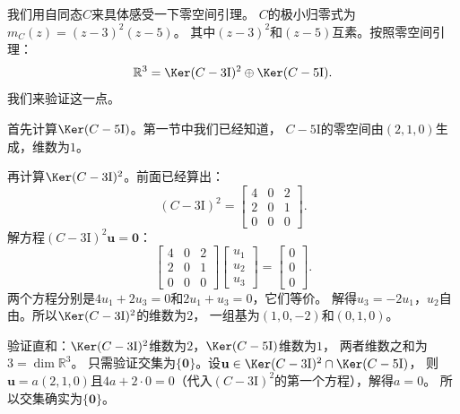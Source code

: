 \documentclass[12pt,UTF8]{ctexbook}
\begin{document}
我们用自同态$C$来具体感受一下零空间引理。
$C$的极小归零式为$m_C(z) = (z-3)^2(z-5)$。
其中$(z-3)^2$和$(z-5)$互素。按照零空间引理：
$$
\mathbb{R}^3 = \Ker (C-3\mathrm{I})^2 \oplus \Ker (C-5\mathrm{I}).
$$
我们来验证这一点。

首先计算$\Ker(C-5\mathrm{I})$。第一节中我们已经知道，
$C-5\mathrm{I}$的零空间由$(2,1,0)$生成，维数为$1$。

再计算$\Ker(C-3\mathrm{I})^2$。前面已经算出：
$$
(C-3\mathrm{I})^2 = \begin{bmatrix} 4 & 0 & 2 \\ 2 & 0 & 1 \\ 0 & 0 & 0 \end{bmatrix}.
$$
解方程$(C-3\mathrm{I})^2\mathbf{u} = \mathbf{0}$：
$$
\begin{bmatrix} 4 & 0 & 2 \\ 2 & 0 & 1 \\ 0 & 0 & 0 \end{bmatrix}\begin{bmatrix} u_1 \\ u_2 \\ u_3 \end{bmatrix} = \begin{bmatrix} 0 \\ 0 \\ 0 \end{bmatrix}.
$$
两个方程分别是$4u_1 + 2u_3 = 0$和$2u_1 + u_3 = 0$，它们等价。
解得$u_3 = -2u_1$，$u_2$自由。所以$\Ker(C-3\mathrm{I})^2$的维数为$2$，
一组基为$(1,0,-2)$和$(0,1,0)$。

验证直和：$\Ker(C-3\mathrm{I})^2$维数为$2$，$\Ker(C-5\mathrm{I})$维数为$1$，
两者维数之和为$3 = \dim \mathbb{R}^3$。
只需验证交集为$\{\mathbf{0}\}$。设$\mathbf{u} \in \Ker(C-3\mathrm{I})^2 \cap \Ker(C-5\mathrm{I})$，
则$\mathbf{u} = a(2,1,0)$且$4a + 2\cdot 0 = 0$（代入$(C-3\mathrm{I})^2$的第一个方程），解得$a = 0$。
所以交集确实为$\{\mathbf{0}\}$。
\end{document}
